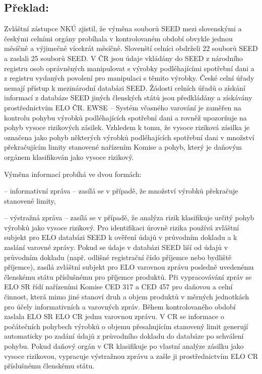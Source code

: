 \documentclass[10pt]{article}
\begin{document}
\pagebreak

\subsection*{Překlad:}

Zvláštní zástupce NKÚ zjistil, že výměna souborů SEED mezi slovenskými a českými celními orgány probíhala v kontrolovaném období obvykle jednou měsíčně a výjimečně vícekrát měsíčně.
Slovenští celníci obdrželi 22 souborů SEED a zaslali 25 souborů SEED.
V ČR jsou údaje vkládány do SEED z národního registru osob oprávněných manipulovat s výrobky podléhajícími spotřební dani a z registru vydaných povolení pro manipulaci s těmito výrobky.
České celní úřady nemají přístup k mezinárodní databázi SEED.
Žádosti celních úřadů o získání informací z databáze SEED jiných členských států jsou předkládány a získávány prostřednictvím ELO ČR.
EWSE – Systém včasného varování je zaměřen na kontrolu pohybu výrobků podléhajících spotřební dani a rovněž upozorňuje na pohyb vysoce rizikových zásilek.
Vzhledem k tomu, že vysoce riziková zásilka je označena jako pohyb některých výrobků podléhajících spotřební dani v množství překračujícím limity stanovené nařízením Komise a pohyb, který je daňovým orgánem klasifikován jako vysoce rizikový.


Výměna informací probíhá ve dvou formách:



– informativní zpráva – zasílá se v případě, že množství výrobků překračuje stanovené limity,

– výstražná zpráva – zasílá se v případě, že analýza rizik klasifikuje určitý pohyb výrobků jako vysoce rizikový.
Pro identifikaci úrovně rizika používá zvláštní subjekt pro ELO databázi SEED k ověření údajů v průvodním dokladu a k zaslání varovné zprávy.
Pokud se údaje v databázi SEED liší od údajů v průvodním dokladu (např. odlišné registrační číslo příjemce nebo bydliště příjemce), zasílá zvláštní subjekt pro ELO varovnou zprávu posledně uvedenému členskému státu příslušnému pro příjemce produktů.
Při vypracovávání zpráv se ELO SR řídí nařízeními Komise CED 317 a CED 457 pro daňovou a celní činnost, která mimo jiné stanoví druh a objem produktů v měrných jednotkách pro účely informativních a varovných zpráv.
Během kontrolovaného období zaslala ELO SR ELO CR jednu varovnou zprávu.
V CR se informace o počátečních pohybech výrobků o objemu přesahujícím stanovený limit generují automaticky po zadání údajů z průvodního dokladu do databáze po schválení pohybu.
Pokud daňový orgán v CR klasifikuje po vlastní analýze zásilku jako vysoce rizikovou, vypracuje výstražnou zprávu a zašle ji prostřednictvím ELO CR příslušnému členskému státu.
\end{document}
